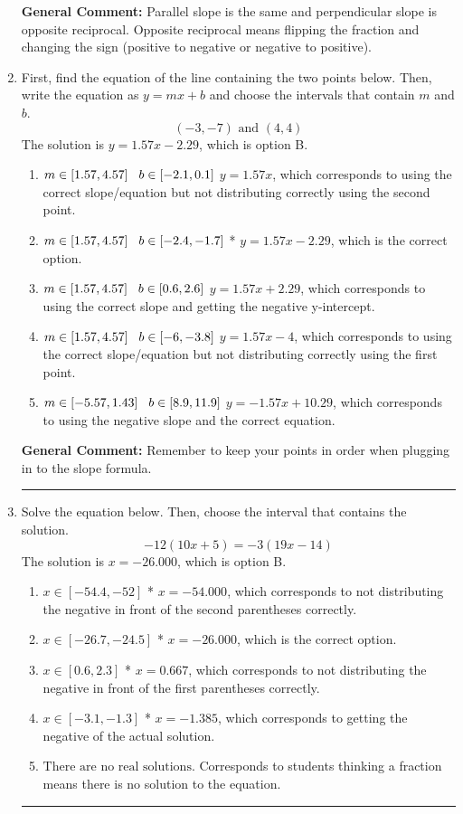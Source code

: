 \documentclass{extbook}[14pt]
\newcommand{\litem}[1]{\item #1

\rule{\textwidth}{0.4pt}}
\begin{document}
\begin{enumerate}
{\textbf{General Comment:} Parallel slope is the same and perpendicular slope is opposite reciprocal. Opposite reciprocal means flipping the fraction and changing the sign (positive to negative or negative to positive).
}
\litem{
First, find the equation of the line containing the two points below. Then, write the equation as $ y=mx+b $ and choose the intervals that contain $m$ and $b$.
\[ (-3, -7) \text{ and } (4, 4) \]
The solution is \( y = 1.57x -2.29 \), which is option B.\begin{enumerate}[label=\Alph*.]
\item \( m \in [1.57, 4.57] \hspace*{3mm} b \in [-2.1, 0.1] \)
 $y = 1.57x$, which corresponds to using the correct slope/equation but not distributing correctly using the second point.
\item \( m \in [1.57, 4.57] \hspace*{3mm} b \in [-2.4, -1.7] \)
* $y = 1.57x -2.29$, which is the correct option.
\item \( m \in [1.57, 4.57] \hspace*{3mm} b \in [0.6, 2.6] \)
 $y = 1.57x + 2.29$, which corresponds to using the correct slope and getting the negative y-intercept.
\item \( m \in [1.57, 4.57] \hspace*{3mm} b \in [-6, -3.8] \)
 $y = 1.57x -4$, which corresponds to using the correct slope/equation but not distributing correctly using the first point.
\item \( m \in [-5.57, 1.43] \hspace*{3mm} b \in [8.9, 11.9] \)
 $y = -1.57x + 10.29$, which corresponds to using the negative slope and the correct equation.
\end{enumerate}

\textbf{General Comment:} Remember to keep your points in order when plugging in to the slope formula.
}

\litem{
Solve the equation below. Then, choose the interval that contains the solution.
\[ -12(10x + 5) = -3(19x -14) \]
The solution is \( x = -26.000 \), which is option B.\begin{enumerate}[label=\Alph*.]
\item \( x \in [-54.4, -52] \)
* $x = -54.000$, which corresponds to not distributing the negative in front of the second parentheses correctly.
\item \( x \in [-26.7, -24.5] \)
* $x = -26.000$, which is the correct option.
\item \( x \in [0.6, 2.3] \)
* $x = 0.667$, which corresponds to not distributing the negative in front of the first parentheses correctly.
\item \( x \in [-3.1, -1.3] \)
* $x = -1.385$, which corresponds to getting the negative of the actual solution.
\item \( \text{There are no real solutions.} \)
Corresponds to students thinking a fraction means there is no solution to the equation.
\end{enumerate}

}
\end{enumerate}
\end{document}
